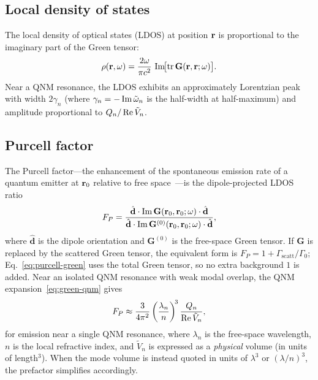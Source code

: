 \subsection{Local density of states}
\label{ssec:ldos}

The local density of optical states (LDOS) at position $\mathbf{r}$ is
proportional to the imaginary part of the Green tensor:
\begin{equation}
 \rho(\mathbf{r},\omega)
 = \frac{2\omega}{\pi c^2}\,\operatorname{Im}\!\bigl[\operatorname{tr}\mathbf{G}(\mathbf{r},\mathbf{r};\omega)\bigr].
 \label{eq:ldos}
\end{equation}
Near a QNM resonance, the LDOS exhibits an approximately Lorentzian peak
with width $2\gamma_n$ (where $\gamma_n = -\operatorname{Im}\tilde{\omega}_n$ is the
half-width at half-maximum) and amplitude proportional to
$Q_n/\operatorname{Re}\tilde{V}_n$.

\subsection{Purcell factor}
\label{ssec:purcell}

The Purcell factor---the enhancement of the spontaneous emission rate of
a quantum emitter at $\mathbf{r}_0$ relative to free space~\cite{ren2021quasinormal,sauvan2014modal}---is the dipole-projected LDOS ratio
\begin{equation}
 F_P =
 \frac{\hat{\mathbf{d}}\cdot\operatorname{Im}\mathbf{G}(\mathbf{r}_0,\mathbf{r}_0;\omega)
 \cdot\hat{\mathbf{d}}}
 {\hat{\mathbf{d}}\cdot\operatorname{Im}\mathbf{G}^{(0)}(\mathbf{r}_0,\mathbf{r}_0;\omega)
 \cdot\hat{\mathbf{d}}},
 \label{eq:purcell-green}
\end{equation}
where $\hat{\mathbf{d}}$ is the dipole orientation and
$\mathbf{G}^{(0)}$ is the free-space Green tensor.  If $\mathbf{G}$ is
replaced by the scattered Green tensor, the equivalent form is
$F_P=1+\Gamma_{\mathrm{scatt}}/\Gamma_0$; Eq.~\eqref{eq:purcell-green}
uses the total Green tensor, so no extra background $1$ is added.  Near
an isolated QNM resonance with weak modal overlap, the QNM expansion~\eqref{eq:green-qnm} gives
\begin{equation}
 F_P \approx \frac{3}{4\pi^2}
 \left(\frac{\lambda_n}{n}\right)^{\!3}
 \frac{Q_n}{\operatorname{Re}\tilde{V}_n},
 \label{eq:purcell-qnm}
\end{equation}
for emission near a single QNM resonance, where $\lambda_n$ is the
free-space wavelength, $n$ is the local refractive index, and
$\tilde{V}_n$ is expressed as a \emph{physical} volume (in units of
length${}^3$).  When the mode volume is instead quoted in units of
$\lambda^3$ or $(\lambda/n)^3$, the prefactor simplifies accordingly.

